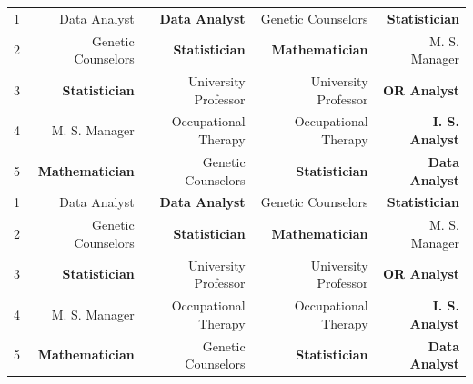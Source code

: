 \documentclass[utf8,12pt]{article} %
\begin{document}
\begin{longtable}{@{}crrrr@{}}
1 & {Data Analyst} & \textbf{Data Analyst}  &  Genetic Counselors & \textbf{Statistician} \\
2 & Genetic Counselors & \textbf{Statistician} & \textbf{Mathematician}  & M. S. Manager \\
3 & \textbf{Statistician} & University Professor  & University Professor & \textbf{OR Analyst}\\
4 &M. S. Manager & Occupational Therapy  & Occupational Therapy & \textbf{I. S. Analyst} \\
5 & \textbf{Mathematician} & Genetic Counselors & \textbf{Statistician} & \textbf{Data Analyst} \\
1 & {Data Analyst} & \textbf{Data Analyst}  &  Genetic Counselors & \textbf{Statistician} \\
2 & Genetic Counselors & \textbf{Statistician} & \textbf{Mathematician}  & M. S. Manager \\
3 & \textbf{Statistician} & University Professor  & University Professor & \textbf{OR Analyst}\\
4 &M. S. Manager & Occupational Therapy  & Occupational Therapy & \textbf{I. S. Analyst} \\
5 & \textbf{Mathematician} & Genetic Counselors & \textbf{Statistician} & \textbf{Data Analyst} \\
\midrule
\bottomrule
\end{longtable}
%
%
\end{document}
